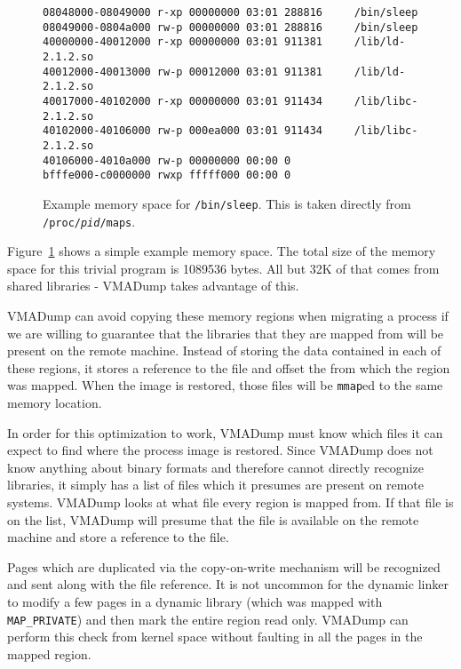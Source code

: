 \begin{figure}
\begin{small}
\begin{verbatim}
08048000-08049000 r-xp 00000000 03:01 288816     /bin/sleep
08049000-0804a000 rw-p 00000000 03:01 288816     /bin/sleep
40000000-40012000 r-xp 00000000 03:01 911381     /lib/ld-2.1.2.so
40012000-40013000 rw-p 00012000 03:01 911381     /lib/ld-2.1.2.so
40017000-40102000 r-xp 00000000 03:01 911434     /lib/libc-2.1.2.so
40102000-40106000 rw-p 000ea000 03:01 911434     /lib/libc-2.1.2.so
40106000-4010a000 rw-p 00000000 00:00 0
bfffe000-c0000000 rwxp fffff000 00:00 0
\end{verbatim}
\end{small}
\caption{Example memory space for \texttt{/bin/sleep}.  This is taken
directly from \texttt{/proc/\emph{pid}/maps}.}
\label{fig:maps}
\end{figure}

Figure~\ref{fig:maps} shows a simple example memory space.  The total
size of the memory space for this trivial program is 1089536 bytes.
All but 32K of that comes from shared libraries - VMADump takes
advantage of this.

VMADump can avoid copying these memory regions when migrating a
process if we are willing to guarantee that the libraries that they
are mapped from will be present on the remote machine.  Instead of
storing the data contained in each of these regions, it stores a
reference to the file and offset the from which the region was mapped.
When the image is restored, those files will be \texttt{mmap}ed to the
same memory location.

In order for this optimization to work, VMADump must know which files
it can expect to find where the process image is restored.  Since
VMADump does not know anything about binary formats and therefore
cannot directly recognize libraries, it simply has a list of files
which it presumes are present on remote systems.  VMADump looks at
what file every region is mapped from.  If that file is on the list,
VMADump will presume that the file is available on the remote machine
and store a reference to the file.

Pages which are duplicated via the copy-on-write mechanism will be
recognized and sent along with the file reference.  It is not uncommon
for the dynamic linker to modify a few pages in a dynamic library
(which was mapped with \texttt{MAP\_PRIVATE}) and then mark the entire
region read only.  VMADump can perform this check from kernel space
without faulting in all the pages in the mapped region.

